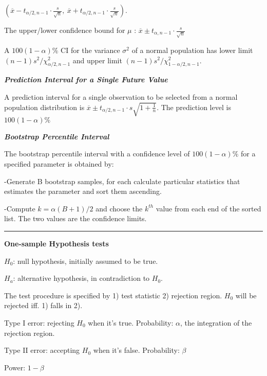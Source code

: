 \documentclass{article}
\newcommand{\sectionline}{\color{black}\rule[2pt]{0.45\textwidth}{0.05em}\color{black}}
\newcommand{\bigtitle}[1]{
	\noindent
	\textbf{#1}
}
\newcommand{\smalltitle}[1]{
	\noindent
	\textbf{\textit{#1}}
}
\begin{document}
	$\left( \overline { x } - t _ { \alpha / 2 , n - 1 } \cdot \frac { s } { \sqrt { n } } ,\: \overline { x } + t _ { \alpha / 2 , n - 1 } \cdot \frac { s } { \sqrt { n } } \right)$.
	
	The upper/lower confidence bound for $\mu$ : $\overline { x } \pm t _ { \alpha , n - 1 } \cdot \frac { s } { \sqrt { n } }$ 
	
	
	A $100(1-\alpha)\%$ CI for the variance $\sigma^2$ of a normal population has lower limit $( n - 1 ) s ^ { 2 } / \chi _ { \alpha / 2 , n - 1 } ^ { 2 }$ and upper limit $( n - 1 ) s ^ { 2 } / \chi _ { 1 - \alpha / 2 , n - 1 } ^ { 2 }$. %
	
	
	\smalltitle{Prediction Interval for a Single Future Value}
	
	A prediction interval for a single observation to be selected from a normal population distribution is $\overline { x } \pm t _ { \alpha / 2 , n - 1 } \cdot s \sqrt { 1 + \frac { 1 } { n } }$. The prediction level is $100(1-\alpha)\%$
	
	
	
	\smalltitle{Bootstrap Percentile Interval}
	
	The bootstrap percentile interval with a confidence level of $100(1-\alpha)\%$ for a specified parameter is obtained by:
	
	-Generate B bootstrap samples, for each calculate particular statistics that estimates the parameter and sort them ascending.
	
	-Compute $k=\alpha(B+1)/2$ and choose the $k^{th}$  value from each end of the sorted list. The two values are the confidence limits.
	
	
	
	\sectionline
	
	\bigtitle{One-sample Hypothesis tests}
	
	$H_0$: null hypothesis, initially assumed to be true.
	
	$H_a$: alternative hypothesis, in contradiction to $H_0$.
	
	The test procedure is specified by 1) test statistic 2) rejection region. $H_0$ will be rejected iff. 1) falls in 2).
	
	Type I error: rejecting $H_0$ when it's true. Probability: $\alpha$, the integration of the rejection region.
	
	
	Type II error: accepting $H_0$ when it's false. Probability: $\beta$
	
	Power: $1-\beta$
	
\end{document}

